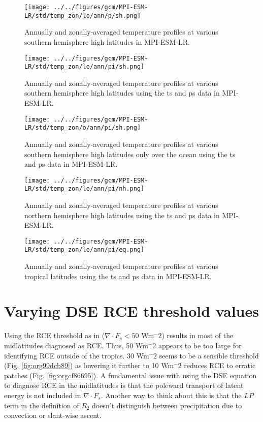 \documentclass[11pt]{article}
\begin{document}
\begin{figure}[htbp]
\centering
\texttt{[image: ../../figures/gcm/MPI-ESM-LR/std/temp\_zon/lo/ann/p/sh.png]}
\caption{\label{fig:orgdc967fb}Annually and zonally-averaged temperature profiles at various southern hemisphere high latitudes in MPI-ESM-LR.}
\end{figure}

\begin{figure}[htbp]
\centering
\texttt{[image: ../../figures/gcm/MPI-ESM-LR/std/temp\_zon/lo/ann/pi/sh.png]}
\caption{\label{fig:orgc342aab}Annually and zonally-averaged temperature profiles at various southern hemisphere high latitudes using the ts and ps data in MPI-ESM-LR.}
\end{figure}

\begin{figure}[htbp]
\centering
\texttt{[image: ../../figures/gcm/MPI-ESM-LR/std/temp\_zon/o/ann/pi/sh.png]}
\caption{\label{fig:org91c292c}Annually and zonally-averaged temperature profiles at various southern hemisphere high latitudes only over the ocean using the ts and ps data in MPI-ESM-LR.}
\end{figure}

\begin{figure}[htbp]
\centering
\texttt{[image: ../../figures/gcm/MPI-ESM-LR/std/temp\_zon/lo/ann/pi/nh.png]}
\caption{\label{fig:orgc52acad}Annually and zonally-averaged temperature profiles at various northern hemisphere high latitudes using the ts and ps data in MPI-ESM-LR.}
\end{figure}

\begin{figure}[htbp]
\centering
\texttt{[image: ../../figures/gcm/MPI-ESM-LR/std/temp\_zon/lo/ann/pi/eq.png]}
\caption{\label{fig:org2c059cb}Annually and zonally-averaged temperature profiles at various tropical latitudes using the ts and ps data in MPI-ESM-LR.}
\end{figure}

\section{Varying DSE RCE threshold values}
\label{sec:org6ccb884}
Using the RCE threshold as in \cite{jakob2019} (\(\nabla\cdot F_s<50\) Wm\(^-2\)) results in most of the midlatitudes diagnosed as RCE. Thus, 50 Wm\(^-2\) appears to be too large for identifying RCE outside of the tropics. 30 Wm\(^-2\) seems to be a sensible threshold (Fig. \ref{fig:org99dcb89}) as lowering it further to 10 Wm\(^-2\) reduces RCE to erratic patches (Fig. \ref{fig:orgcf86695}). A fundamental issue with using the DSE equation to diagnose RCE in the midlatitudes is that the poleward transport of latent energy is not included in \(\nabla\cdot F_s\). Another way to think about this is that the \(LP\) term in the definition of \(R_2\) doesn't distinguish between precipitation due to convection or slant-wise ascent.
\end{document}
